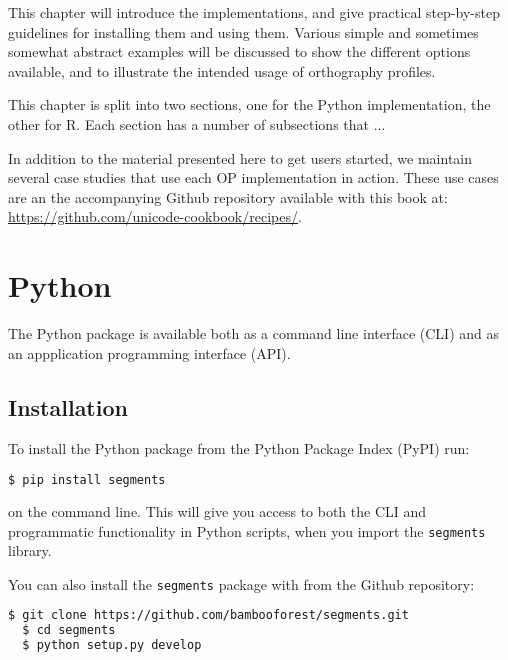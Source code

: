 \documentclass[output=inprep,
		biblatex
		]{LSP/langsci}\usepackage[]{graphicx}\usepackage[]{color}
\begin{document}
This chapter will introduce the implementations, and give practical step-by-step 
guidelines for installing them and using them. Various simple and sometimes 
somewhat abstract examples will be discussed to show the different options 
available, and to illustrate the intended usage of orthography profiles. 

This chapter is split into two sections, one for the Python implementation, the 
other for R. Each section has a number of subsections that ...

In addition to the material presented here to get users started, we maintain 
several case studies that use each OP implementation in action. These use cases 
are an the accompanying Github repository available with this book at: 
\url{https://github.com/unicode-cookbook/recipes/}.



\section{Python}
\label{python-implementations}

The Python package is available both as a command line interface (CLI) 
and as an appplication programming interface (API).

\subsection*{Installation}

To install the Python package from the Python Package Index (PyPI) run:

\begin{lstlisting}[language=bash]
  $ pip install segments
\end{lstlisting}

\noindent on the command line. This will give you access to both 
the CLI and programmatic functionality in Python scripts, when 
you import the \texttt{segments} library.

You can also install the \texttt{segments} 
package with from the Github repository:

\begin{lstlisting}[language=bash]
  $ git clone https://github.com/bambooforest/segments.git
  $ cd segments
  $ python setup.py develop
\end{lstlisting}
\end{document}
